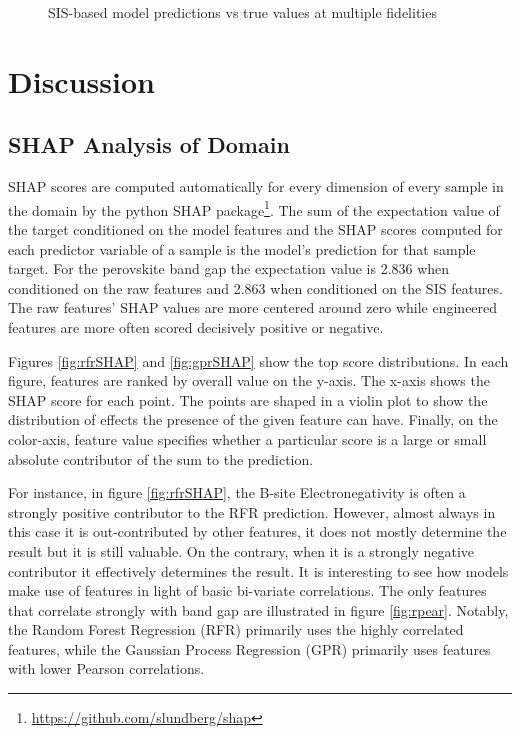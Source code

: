  
\begin{figure}[htbp]
\centering

\caption{\label{fig:sis-pairplots} SIS-based model predictions vs true values at multiple fidelities}
\end{figure}

\section{Discussion}
\label{sec:orgd622d0c}
\subsection{SHAP Analysis of Domain}
\label{sec:org1471ff9}
SHAP scores are computed automatically for every dimension of every sample in the domain by the python SHAP package\footnote{\url{https://github.com/slundberg/shap}}.
The sum of the expectation value of the target conditioned on the model features and the  SHAP scores computed for each predictor variable of a sample is the model's  prediction for that sample target.
\autocite{lundberg-2017-unified-approac}
For the perovskite band gap the expectation value is 2.836 when conditioned on the raw features and 2.863 when conditioned on the SIS features.
The raw features' SHAP values are more centered around zero while engineered features are more often scored decisively positive or negative.

Figures \ref{fig:rfrSHAP} and \ref{fig:gprSHAP} show the top score distributions.
In each figure, features are ranked by overall value on the y-axis.
The x-axis shows the SHAP score for each point.
The points are shaped in a violin plot to show the distribution of effects the presence of the given feature can have.
Finally, on the color-axis, feature value specifies whether a particular score is a large or small absolute contributor of the sum to the prediction.

For instance, in figure \ref{fig:rfrSHAP}, the B-site Electronegativity is often a strongly positive contributor to the RFR prediction.
However, almost always in this case it is out-contributed by other features, it does not mostly determine the result but it is still valuable.
On the contrary, when it is a strongly negative contributor it effectively determines the result.
It is interesting to see how models make use of features in light of basic bi-variate correlations.
The only features that correlate strongly with band gap are illustrated in figure \ref{fig:rpear}.
Notably, the Random Forest Regression (RFR) primarily uses the highly correlated features, while the Gaussian Process Regression (GPR) primarily uses features with lower Pearson correlations.

